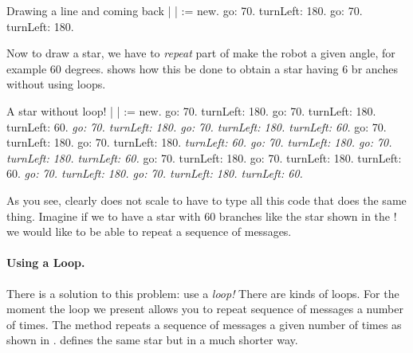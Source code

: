 \begin{scriptwithtitle}{Drawing a line and coming back}\label{scr:line}
| \caro |
\caro := \Turtle new.
\caro go: 70.
\caro turnLeft: 180.
\caro go: 70.
\caro turnLeft: 180.
\end{scriptwithtitle}

Now to draw a star, we have to \emph{repeat} part of    make the robot  a given angle, for example 60
degrees.   shows how this  be done to
obtain a star having 6 br
 anches without using loops.

\begin{scriptwithtitle}{A star without loop!}\label{scr:star}
| \caro |
\caro := \Turtle new.
\caro go: 70.
\caro turnLeft: 180.
\caro go: 70.
\caro turnLeft: 180.
\caro turnLeft: 60. 
\textit{\caro go: 70.
\caro turnLeft: 180.
\caro go: 70.
\caro turnLeft: 180.
\caro turnLeft: 60.}
\caro go: 70.
\caro turnLeft: 180.
\caro go: 70.
\caro turnLeft: 180.
\textit{\caro turnLeft: 60. 
\caro go: 70.
\caro turnLeft: 180.
\caro go: 70.
\caro turnLeft: 180.
\caro turnLeft: 60.} 
\caro go: 70.
\caro turnLeft: 180.
\caro go: 70.
\caro turnLeft: 180.
\caro turnLeft: 60. 
\textit{\caro go: 70.
\caro turnLeft: 180.
\caro go: 70.
\caro turnLeft: 180.
\caro turnLeft: 60.} 
\end{scriptwithtitle}

As you see,  clearly does not scale to have to  type all this code that
does  the same thing. Imagine if we  to have a
star with 60 branches like the star shown in the
!  we would like to be able to 
repeat a sequence of messages.

\paragraph{Using a  Loop.} There is a solution to this problem: use a \emph{loop!} There are  kinds of loops. For the moment the loop we present allows you to repeat  sequence of messages a  number of times. The method \timesRepeat  {} repeats a sequence of  messages a given number of times as shown in  .   defines the same star    but in a much shorter way. 

